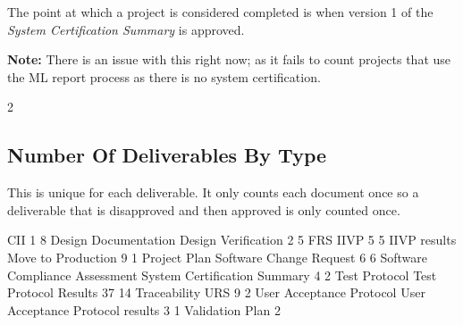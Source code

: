 \documentclass{article}
\begin{document}
The point at which a project is considered completed is when version 1 of the
\textit{System Certification Summary} is approved.

\textbf{Note:} There is an issue with this right now; as it fails to count projects
that use the ML report process as there is no system certification.

\begin{Schunk}
\begin{Soutput}
[1] 2
\end{Soutput}
\end{Schunk}


\subsection{Number Of Deliverables By Type}
This is unique for each deliverable. It only counts each document once so a deliverable
that is disapproved and then approved is only counted once.

\begin{Schunk}
\begin{Soutput}
                                                              CII 
                               1                                8 
            Design Documentation              Design Verification 
                               2                                5 
                             FRS                             IIVP 
                               5                                5 
                    IIVP results               Move to Production 
                               9                                1 
                    Project Plan          Software Change Request 
                               6                                6 
  Software Compliance Assessment     System Certification Summary 
                               4                                2 
                   Test Protocol            Test Protocol Results 
                              37                               14 
                    Traceability                              URS 
                               9                                2 
        User Acceptance Protocol User Acceptance Protocol results 
                               3                                1 
                 Validation Plan 
                               2 
\end{Soutput}
\end{Schunk}
\end{document}
